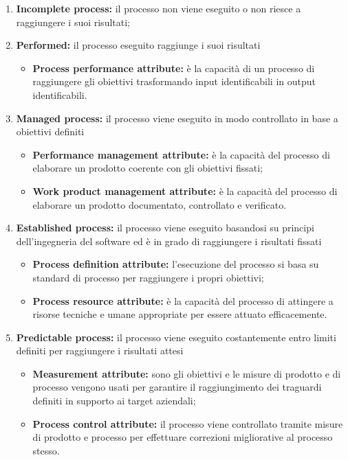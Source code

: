 \begin{enumerate}[label*=\arabic*]
	\item \textbf{Incomplete process:} il processo non viene eseguito o non riesce a raggiungere i suoi risultati;
	
	\item \textbf{Performed:} il processo eseguito raggiunge i suoi risultati
		\begin{itemize}
			\item \textbf{Process performance attribute:} è la capacità di un processo di raggiungere gli obiettivi trasformando input identificabili in output identificabili.
		\end{itemize}
		
	\item \textbf{Managed process:} il processo viene eseguito in modo controllato in base a obiettivi definiti
		\begin{itemize}
			\item \textbf{Performance management attribute:} è la capacità del processo di elaborare un prodotto coerente con gli obiettivi fissati;
			\item \textbf{Work product management attribute:} è la capacità del processo di elaborare un prodotto documentato, controllato e verificato.
		\end{itemize}
		
		
	\item \textbf{Established process:} il processo viene eseguito basandosi su principi dell'ingegneria del software ed è in grado di raggiungere i risultati fissati
		\begin{itemize}
			\item \textbf{Process definition attribute:} l'esecuzione del processo si basa su standard di processo per raggiungere i propri obiettivi;
			\item \textbf{Process resource attribute:} è la capacità del processo di attingere a risorse tecniche e umane appropriate per essere attuato efficacemente.
		\end{itemize}
		
	\item \textbf{Predictable process:} il processo viene eseguito costantemente entro limiti definiti per raggiungere i risultati attesi
		\begin{itemize}
			\item\textbf{Measurement attribute:} sono gli obiettivi e le misure di prodotto e di processo vengono usati per garantire il raggiungimento dei traguardi definiti in supporto ai target aziendali;
			\item \textbf{Process control attribute:} il processo viene controllato tramite misure di prodotto e processo per effettuare correzioni migliorative al processo stesso.
		\end{itemize}
		

\end{enumerate}
